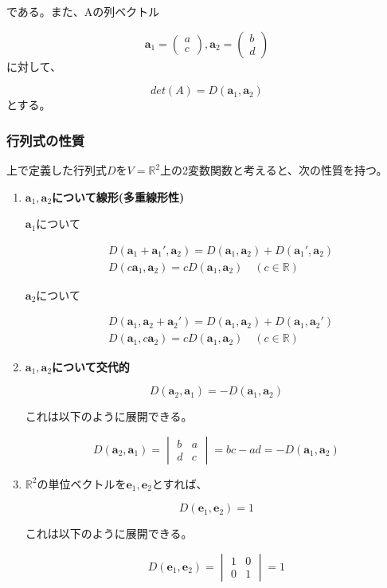 \documentclass[dvipdfmx,autodetect-engine]{jsarticle}
\theoremstyle{definition}
\newcommand{\vecSpace}[1]{\mathbb{R}^{#1}}
\begin{document}
である。また、Aの列ベクトル

$$
\bm{a}_1 = \begin{pmatrix}
a \\
c
\end{pmatrix},
\bm{a}_2 = \begin{pmatrix}
b \\
d
\end{pmatrix}
$$に対して、

$$
det(A) = D(\bm{a}_1, \bm{a}_2)
$$
とする。

\subsubsection{行列式の性質}

上で定義した行列式$D$を$V = \vecSpace{2}$上の2変数関数と考えると、次の性質を持つ。

\begin{enumerate}
\renewcommand{\labelenumi}{(\arabic{enumi})}
\item {\bf $\bm{a}_1, \bm{a}_2$について線形(多重線形性)}

$\bm{a}_1$について

\begin{eqnarray*}
&D(\bm{a}_1 + \bm{a}_1', \bm{a}_2) = D(\bm{a}_1, \bm{a}_2) + D(\bm{a}_1',  \bm{a}_2) \\
&D(c\bm{a}_1, \bm{a}_2) = cD(\bm{a}_1, \bm{a}_2) \quad (c \in \mathbb{R})
\end{eqnarray*}

$\bm{a}_2$について

\begin{eqnarray*}
&D(\bm{a}_1, \bm{a}_2 + \bm{a}_2') = D(\bm{a}_1, \bm{a}_2) + D(\bm{a}_1,  \bm{a}_2') \\
&D(\bm{a}_1, c\bm{a}_2) = cD(\bm{a}_1, \bm{a}_2) \quad (c \in \mathbb{R})
\end{eqnarray*}


\item {\bf $\bm{a}_1, \bm{a}_2$について交代的}

$$
D(\bm{a}_2, \bm{a}_1) = -D(\bm{a}_1, \bm{a}_2)
$$

これは以下のように展開できる。

$$
D(\bm{a}_2, \bm{a}_1) = \begin{vmatrix}
b & a \\
d & c
\end{vmatrix} = bc - ad = -D(\bm{a}_1, \bm{a}_2)
$$

\item $\vecSpace{2}$の単位ベクトルを$\bm{e}_1, \bm{e}_2$とすれば、

$$
D(\bm{e}_1, \bm{e}_2) = 1
$$

これは以下のように展開できる。

$$
D(\bm{e}_1, \bm{e}_2) = \begin{vmatrix}
1 & 0 \\
0 & 1
\end{vmatrix} = 1
$$

\end{enumerate}
\end{document}
